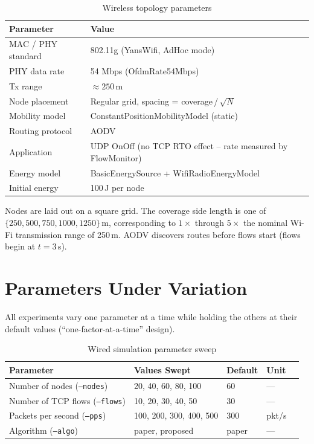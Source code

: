 \documentclass[12pt,a4paper]{report}
\begin{document}
\begin{table}[H]
  \centering
  \caption{Wireless topology parameters}
  \label{tab:wireless-params}
  \begin{tabular}{ll}
    \toprule
    \textbf{Parameter}      & \textbf{Value} \\
    \midrule
    MAC / PHY standard      & 802.11g (YansWifi, AdHoc mode) \\
    PHY data rate           & 54 Mbps (OfdmRate54Mbps) \\
    Tx range                & $\approx 250$\,m \\
    Node placement          & Regular grid, spacing = coverage\,/\,$\sqrt{N}$ \\
    Mobility model          & ConstantPositionMobilityModel (static) \\
    Routing protocol        & AODV \\
    Application             & UDP OnOff (no TCP RTO effect -- rate measured by FlowMonitor) \\
    Energy model            & BasicEnergySource + WifiRadioEnergyModel \\
    Initial energy          & 100\,J per node \\
    \bottomrule
  \end{tabular}
\end{table}

\noindent Nodes are laid out on a square grid.  The coverage side length is
one of $\{250, 500, 750, 1000, 1250\}$\,m, corresponding to $1\times$ through
$5\times$ the nominal Wi-Fi transmission range of 250\,m.  AODV discovers
routes before flows start (flows begin at $t=3$\,s).

\chapter{Parameters Under Variation}
\label{ch:params}

All experiments vary one parameter at a time while holding the others at their
default values (``one-factor-at-a-time'' design).

\begin{table}[H]
  \centering
  \caption{Wired simulation parameter sweep}
  \label{tab:wired-sweep}
  \begin{tabular}{lllll}
    \toprule
    \textbf{Parameter} & \textbf{Values Swept} & \textbf{Default} & \textbf{Unit} \\
    \midrule
    Number of nodes (\texttt{--nodes}) & 20, 40, 60, 80, 100 & 60 & --- \\
    Number of TCP flows (\texttt{--flows}) & 10, 20, 30, 40, 50 & 30 & --- \\
    Packets per second (\texttt{--pps}) & 100, 200, 300, 400, 500 & 300 & pkt/s \\
    Algorithm (\texttt{--algo}) & paper, proposed & paper & --- \\
    \bottomrule
  \end{tabular}
\end{table}
\end{document}
